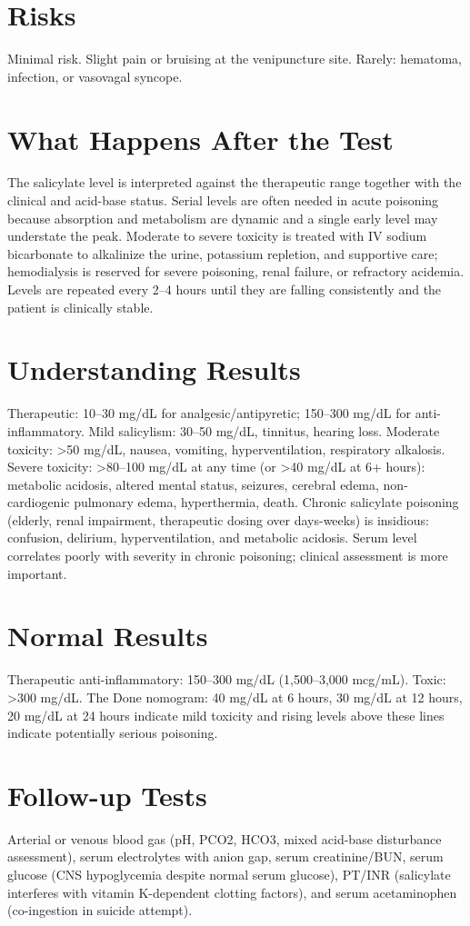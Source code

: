 \section*{Risks}
Minimal risk. Slight pain or bruising at the venipuncture site. Rarely: hematoma, infection, or vasovagal syncope.
\section*{What Happens After the Test}
The salicylate level is interpreted against the therapeutic range together with the clinical and acid-base status. Serial levels are often needed in acute poisoning because absorption and metabolism are dynamic and a single early level may understate the peak. Moderate to severe toxicity is treated with IV sodium bicarbonate to alkalinize the urine, potassium repletion, and supportive care; hemodialysis is reserved for severe poisoning, renal failure, or refractory acidemia. Levels are repeated every 2--4 hours until they are falling consistently and the patient is clinically stable.
\section*{Understanding Results}
Therapeutic: 10--30 mg/dL for analgesic/antipyretic; 150--300 mg/dL for anti-inflammatory. Mild salicylism: 30--50 mg/dL, tinnitus, hearing loss. Moderate toxicity: >50 mg/dL, nausea, vomiting, hyperventilation, respiratory alkalosis. Severe toxicity: >80--100 mg/dL at any time (or >40 mg/dL at 6+ hours): metabolic acidosis, altered mental status, seizures, cerebral edema, non-cardiogenic pulmonary edema, hyperthermia, death. Chronic salicylate poisoning (elderly, renal impairment, therapeutic dosing over days-weeks) is insidious: confusion, delirium, hyperventilation, and metabolic acidosis. Serum level correlates poorly with severity in chronic poisoning; clinical assessment is more important.
\section*{Normal Results}
Therapeutic anti-inflammatory: 150--300 mg/dL (1,500--3,000 mcg/mL). Toxic: >300 mg/dL. The Done nomogram: 40 mg/dL at 6 hours, 30 mg/dL at 12 hours, 20 mg/dL at 24 hours indicate mild toxicity and rising levels above these lines indicate potentially serious poisoning.
\section*{Follow-up Tests}
Arterial or venous blood gas (pH, PCO2, HCO3, mixed acid-base disturbance assessment), serum electrolytes with anion gap, serum creatinine/BUN, serum glucose (CNS hypoglycemia despite normal serum glucose), PT/INR (salicylate interferes with vitamin K-dependent clotting factors), and serum acetaminophen (co-ingestion in suicide attempt).
